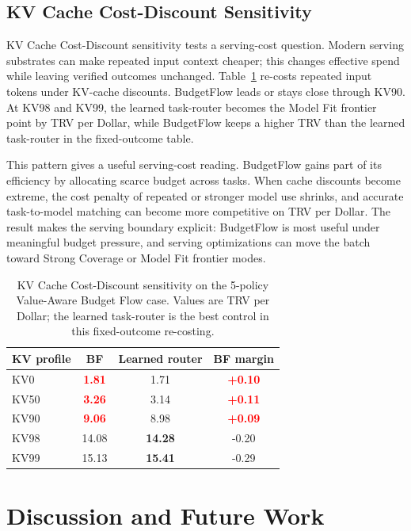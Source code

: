 \documentclass{article}
\newcommand{\method}{BudgetFlow\xspace}
\newcommand{\trv}{TRV\xspace}
\newcommand{\pos}[1]{\textcolor{red}{\textbf{#1}}}
\newcommand{\ctrl}[1]{\textcolor{bfblue}{\textbf{#1}}}
\begin{document}
\subsection{KV Cache Cost-Discount Sensitivity}
KV Cache Cost-Discount sensitivity tests a serving-cost question. Modern serving substrates can make repeated input context cheaper; this changes effective spend while leaving verified outcomes unchanged. Table~\ref{tab:kv-sensitivity} re-costs repeated input tokens under KV-cache discounts. \method leads or stays close through KV90. At KV98 and KV99, the learned task-router becomes the Model Fit frontier point by \trv per Dollar, while \method keeps a higher \trv than the learned task-router in the fixed-outcome table.

This pattern gives a useful serving-cost reading. \method gains part of its efficiency by allocating scarce budget across tasks. When cache discounts become extreme, the cost penalty of repeated or stronger model use shrinks, and accurate task-to-model matching can become more competitive on \trv per Dollar. The result makes the serving boundary explicit: BudgetFlow is most useful under meaningful budget pressure, and serving optimizations can move the batch toward Strong Coverage or Model Fit frontier modes.

\begin{table}[t]
\centering
\small
\begin{tabular}{lccc}
\toprule
KV profile & BF & Learned router & BF margin \\
\midrule
KV0 & \pos{1.81} & 1.71 & \pos{+0.10} \\
KV50 & \pos{3.26} & 3.14 & \pos{+0.11} \\
KV90 & \pos{9.06} & 8.98 & \pos{+0.09} \\
KV98 & 14.08 & \ctrl{14.28} & -0.20 \\
KV99 & 15.13 & \ctrl{15.41} & -0.29 \\
\bottomrule
\end{tabular}
\caption{KV Cache Cost-Discount sensitivity on the 5-policy Value-Aware Budget Flow case. Values are \trv per Dollar; the learned task-router is the best control in this fixed-outcome re-costing.}
\label{tab:kv-sensitivity}
\end{table}

\section{Discussion and Future Work}
\label{sec:discussion}
\end{document}
